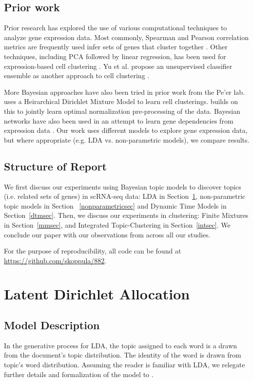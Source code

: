 \documentclass{article}
\begin{document}
\subsection{Prior work}
Prior research has explored the use of various computational techniques to analyze gene expression data. Most commonly, Spearman and Pearson correlation metrics are frequently used infer sets of genes that cluster together \cite{profiling, nature}. Other techniques, including PCA followed by linear regression, has been used for expression-based cell clustering \cite{transcriptomics}. Yu et al. propose an unsupervised classifier ensemble as another approach to cell clustering \cite{consensus}. 

More Bayesian approaches have also been tried in prior work from the Pe'er lab. \cite{bayesge2} uses a Heirarchical Dirichlet Mixture Model to learn cell clusterings. \cite{bayesge1} builds on this to jointly learn optimal normalization pre-processing of the data. Bayesian networks have also been used in an attempt to learn gene dependencies from expression data \cite{bayesge3}. Our work uses different models to explore gene expression data, but where appropriate (e.g. LDA vs. non-parametric models), we compare results.

\subsection{Structure of Report}
We first discuss our experiments using Bayesian topic models to discover topics (i.e. related sets of genes) in scRNA-seq data: LDA in Section~\ref{ldasec}, non-parametric topic models in Section ~\ref{nonparametricsec} and Dynamic Time Models in Section~\ref{dtmsec}. Then, we discuss our experiments in clustering: Finite Mixtures in Section~\ref{mmsec}, and Integrated Topic-Clustering in Section~\ref{intsec}. We conclude our paper with our observations from across all our studies.

For the purpose of reproducibility, all code can be found at \url{https://github.com/skoppula/882}.

\section{Latent Dirichlet Allocation} 
\label{ldasec}
\subsection{Model Description} 
In the generative process for LDA, the topic assigned to each word is a drawn from the document's topic distribution. The identity of the word is drawn from topic's word distribution. Assuming the reader is familiar with LDA, we relegate further details and formalization of the model to \cite{LDA}.
\end{document}
